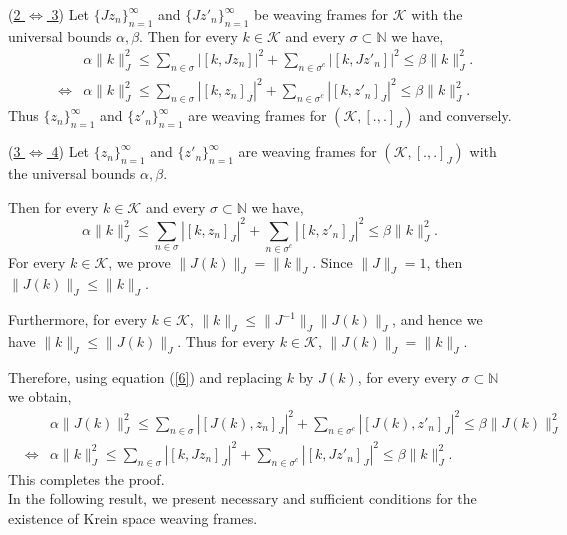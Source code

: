 \documentclass[article,12pt]{amsart}
\begin{document}
\noindent  (\underline{2 $\Longleftrightarrow$ 3}) Let $\{J z_n\}_{n=1}^\infty$ and $\{J z'_n\}_{n=1}^\infty$ be weaving frames for $\mathcal K$ with the universal bounds $\alpha, \beta$. Then for every $k \in \mathcal K$ and every $\sigma \subset \mathbb N$ we have, 
\begin{eqnarray*}
	&& \alpha \|k\|_{J}^2 \leq \sum\limits_{n \in \sigma} |[k, J z_n]|^2 + \sum\limits_{n \in \sigma^c} |[k, J z'_n]|^2 \leq \beta \|k\|_{J}^2.\\
	& \Leftrightarrow & \alpha \|k\|_{J}^2 \leq \sum\limits_{n \in \sigma} |[k, z_n]_{J}|^2 + \sum\limits_{n \in \sigma^c} |[k, z'_n]_{J}|^2 \leq \beta \|k\|_{J}^2.
\end{eqnarray*}
Thus $\{z_n\}_{n=1}^\infty$ and $\{z'_n\}_{n=1}^\infty$ are weaving frames for $(\mathcal K, [.,.]_J)$ and conversely.

\noindent  (\underline{3 $\Longleftrightarrow$ 4}) Let $\{z_n\}_{n=1}^\infty$ and $\{z'_n\}_{n=1}^\infty$ are weaving frames for $(\mathcal K, [.,.]_J)$ with the universal bounds $\alpha, \beta$. 

Then for every $k \in \mathcal K$ and every $\sigma \subset \mathbb N$ we have, 
\begin{equation}\label{6}
	\alpha \|k\|_{J}^2 \leq \sum\limits_{n \in \sigma} |[k, z_n]_{J}|^2 + \sum\limits_{n \in \sigma^c} |[k, z'_n]_{J}|^2 \leq \beta \|k\|_{J}^2.
\end{equation}
For every $k \in \mathcal K$, we prove $\|J(k)\|_{J}=\|k\|_{J}$. Since $\|J\|_{J}=1$, then $\|J(k)\|_{J} \leq \|k\|_{J}$. 

Furthermore, for every $k \in \mathcal K$, $\|k\|_{J} \leq \|J^{-1}\|_{J} \|J(k)\|_{J}$, and hence we have $\|k\|_{J} \leq \|J(k)\|_{J}$.  Thus for every $k \in \mathcal K$, $\|J(k)\|_{J}=\|k\|_{J}$.

Therefore, using equation (\ref{6}) and replacing $k$ by $J(k)$, for every every $\sigma \subset \mathbb N$ we obtain,
\begin{eqnarray*}
	&& \alpha \|J(k)\|_{J}^2 \leq \sum\limits_{n \in \sigma} |[J(k), z_n]_{J}|^2 + \sum\limits_{n \in \sigma^c} |[J(k), z'_n]_{J}|^2 \leq \beta \|J(k)\|_{J}^2\\
	& \Leftrightarrow & \alpha \|k\|_{J}^2 \leq \sum\limits_{n \in \sigma} |[k, J z_n]_{J}|^2 + \sum\limits_{n \in \sigma^c} |[k, Jz'_n]_{J}|^2 \leq \beta \|k\|_{J}^2.
\end{eqnarray*}
This completes the proof.\\


In the following result, we present necessary and sufficient conditions for the existence of Krein space weaving frames. 
\end{document}
